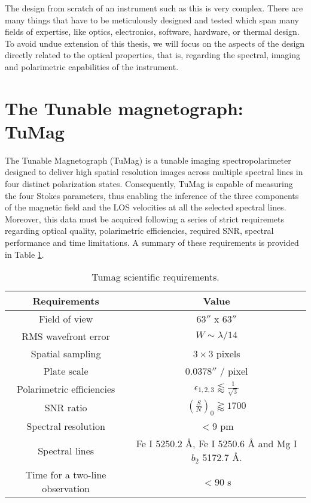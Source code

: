 The design from scratch of an instrument such as this is very complex. There are many things that have to be meticulously designed and tested which span many fields of expertise, like optics, electronics, software, hardware, or thermal design. To avoid undue extension of this thesis, we will focus on the aspects of the design directly related to the optical properties, that is, regarding the spectral, imaging and polarimetric capabilities of the instrument. 

\section{The Tunable magnetograph: TuMag}

The Tunable Magnetograph (TuMag) is a tunable imaging spectropolarimeter designed to deliver high spatial resolution images across multiple spectral lines in four distinct polarization states. Consequently, TuMag is capable of measuring the four Stokes parameters, thus enabling the inference of the three components of the magnetic field and the LOS velocities at all the selected spectral lines. Moreover, this data must be acquired following a series of strict requiremets regarding optical quality, polarimetric efficiencies, required SNR, spectral performance and time limitations. A summary of these requirements is provided in Table \ref{table: Tumags requirements}. 

\begin{table}
    \centering
   \begin{tabular}{cc}
    \hline
    \hline
    Requirements & Value \\
    \hline
    Field of view & $63''$ x $63''$ \\
    RMS wavefront error & $W \sim \lambda / 14$\\
    Spatial sampling & $3 \times 3 $ pixels \\
    Plate scale & $0.0378''$ / pixel \\
    Polarimetric efficiencies & $\epsilon _ {1, 2, 3} \lessapprox \frac{1}{\sqrt{3}}$\\
    SNR ratio & $\left(\frac{S}{N}\right) _ 0 \gtrapprox 1700$ \\
    Spectral resolution & $< 9$ pm\\  
    Spectral lines & Fe I 5250.2 \r{A}, Fe I 5250.6 \r{A} and Mg I $b_2$ 5172.7 \r{A}. \\
    Time for a two-line observation & $< 90$ s\\
    \hline
    \hline
    \end{tabular}
    \caption{Tumag scientific requirements.}
    \label{table: Tumags requirements}
\end{table}

